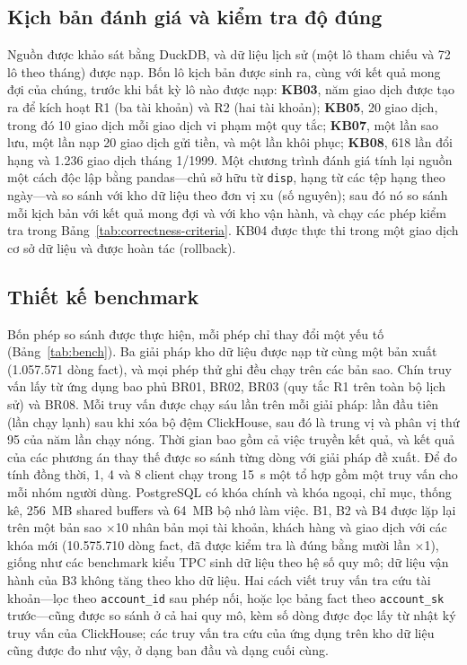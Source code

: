 \documentclass[peerreview]{IEEEtran}
\newcommand{\tbl}[1]{\texttt{#1}}
\begin{document}
\subsection{Kịch bản đánh giá và kiểm tra độ đúng}
Nguồn được khảo sát bằng DuckDB, và dữ liệu lịch sử (một lô tham chiếu và 72 lô theo tháng)
được nạp. Bốn lô kịch bản được sinh ra, cùng với kết quả mong đợi của chúng, trước khi bất
kỳ lô nào được nạp: \textbf{KB03}, năm giao dịch được tạo ra để kích hoạt R1 (ba tài khoản)
và R2 (hai tài khoản); \textbf{KB05}, 20 giao dịch, trong đó 10 giao dịch mỗi giao dịch vi
phạm một quy tắc; \textbf{KB07}, một lần sao lưu, một lần nạp 20 giao dịch gửi tiền, và một
lần khôi phục; \textbf{KB08}, 618 lần đổi hạng và 1.236 giao dịch tháng 1/1999. Một chương
trình đánh giá tính lại nguồn một cách độc lập bằng pandas---chủ sở hữu từ \tbl{disp}, hạng
từ các tệp hạng theo ngày---và so sánh với kho dữ liệu theo đơn vị xu (số nguyên); sau đó nó
so sánh mỗi kịch bản với kết quả mong đợi và với kho vận hành, và chạy các phép kiểm tra
trong Bảng~\ref{tab:correctness-criteria}. KB04 được thực thi trong một giao dịch cơ sở dữ
liệu và được hoàn tác (rollback).

\subsection{Thiết kế benchmark}
Bốn phép so sánh được thực hiện, mỗi phép chỉ thay đổi một yếu tố (Bảng~\ref{tab:bench}). Ba
giải pháp kho dữ liệu được nạp từ cùng một bản xuất (1.057.571 dòng fact), và mọi phép thử
ghi đều chạy trên các bản sao. Chín truy vấn lấy từ ứng dụng bao phủ BR01, BR02, BR03 (quy
tắc R1 trên toàn bộ lịch sử) và BR08. Mỗi truy vấn được chạy sáu lần trên mỗi giải pháp: lần
đầu tiên (lần chạy lạnh) sau khi xóa bộ đệm ClickHouse, sau đó là trung vị và phân vị thứ 95
của năm lần chạy nóng. Thời gian bao gồm cả việc truyền kết quả, và kết quả của các phương án
thay thế được so sánh từng dòng với giải pháp đề xuất. Để đo tính đồng thời, 1, 4 và 8 client
chạy trong 15~s một tổ hợp gồm một truy vấn cho mỗi nhóm người dùng. PostgreSQL có khóa chính
và khóa ngoại, chỉ mục, thống kê, 256~MB shared buffers và 64~MB bộ nhớ làm việc. B1, B2 và B4
được lặp lại trên một bản sao $\times$10 nhân bản mọi tài khoản, khách hàng và giao dịch với
các khóa mới (10.575.710 dòng fact, đã được kiểm tra là đúng bằng mười lần $\times$1), giống
như các benchmark kiểu TPC \cite{tpch,tpcds} sinh dữ liệu theo hệ số quy mô; dữ liệu vận hành
của B3 không tăng theo kho dữ liệu. Hai cách viết truy vấn tra cứu tài khoản---lọc theo
\tbl{account\_id} sau phép nối, hoặc lọc bảng fact theo \tbl{account\_sk} trước---cũng được so
sánh ở cả hai quy mô, kèm số dòng được đọc lấy từ nhật ký truy vấn của ClickHouse; các truy
vấn tra cứu của ứng dụng trên kho dữ liệu cũng được đo như vậy, ở dạng ban đầu và dạng cuối
cùng.
\end{document}
